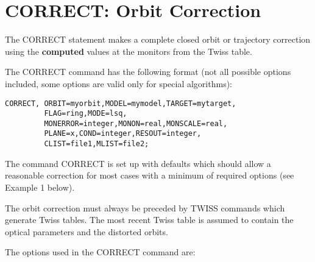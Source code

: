 
\section{CORRECT: Orbit Correction}  

The CORRECT statement makes a complete closed orbit  or trajectory
correction using the \textbf{computed} values at the monitors  from the
Twiss table.   

The CORRECT command has the following format (not all possible options
included, some options are valid only for special algorithms):  

\begin{verbatim}
CORRECT, ORBIT=myorbit,MODEL=mymodel,TARGET=mytarget,
         FLAG=ring,MODE=lsq,  
         MONERROR=integer,MONON=real,MONSCALE=real,
         PLANE=x,COND=integer,RESOUT=integer,
         CLIST=file1,MLIST=file2; 
\end{verbatim} 

The command CORRECT is set up with defaults which should allow a
reasonable correction for most cases with a minimum of required options
(see Example 1 below).  

The orbit correction must always be preceded by TWISS commands  which
generate Twiss tables. The most recent Twiss table is assumed to contain
the optical parameters and the distorted orbits. 

The options used in the CORRECT command are: 

